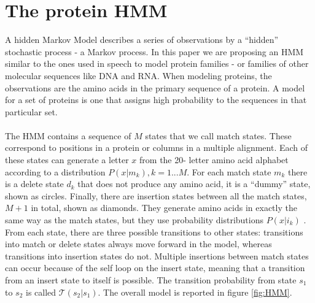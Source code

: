 \section{The protein HMM}
A hidden Markov Model describes a series of observations by a “hidden” stochastic process - a Markov process.
In this paper we are proposing an HMM similar to the ones used in speech to model protein families - or families of other molecular sequences like DNA and RNA. When modeling proteins, the observations are the amino acids in the primary sequence of a protein. A model for a set of proteins is one that assigns high probability to the sequences in that particular set.
\\
\\
\noindent
The HMM contains a sequence of $M$ states that we call match states. These correspond to positions in a protein or columns in a multiple alignment. Each of these states can generate a letter $x$ from the 20- letter amino acid alphabet according to a distribution $P(x|m_k), k= 1...M$.  For each match state $m_k$ there is a delete state $d_k$ that does not produce any amino acid, it is a “dummy” state, shown as circles. Finally, there are insertion states between all the match states, $M + 1$ in total, shown as diamonds. They generate amino acids in exactly the same way as the match states, but they use probability distributions $P ( x | i_k )$ .
From each state, there are three possible transitions to other states: transitions into match or delete states always move forward in the model, whereas transitions into insertion states do not. Multiple insertions between match states can occur because of the self loop on the insert state, meaning that a transition from an insert state to itself is possible. The transition probability from state $s_1$ to $s_2$ is called $\mathcal{T}(s_2|s_1)$.
The overall model is reported in figure \ref{fig:HMM}.

